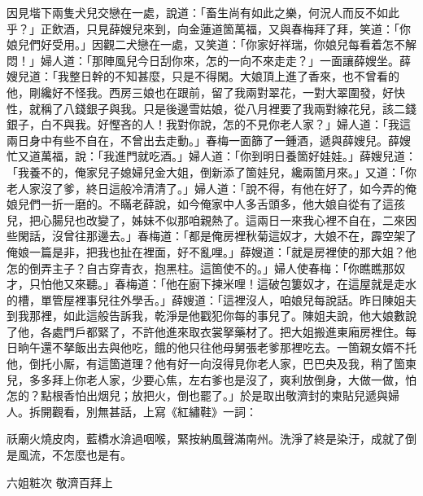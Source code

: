 因見堦下兩隻犬兒交戀在一處，說道：「畜生尚有如此之樂，何況人而反不如此乎？」正飲酒，只見薛嫂兒來到，向金蓮道箇萬福，又與春梅拜了拜，笑道：「你娘兒們好受用。」因觀二犬戀在一處，又笑道：「你家好祥瑞，你娘兒每看着怎不解悶！」婦人道：「那陣風兒今日刮你來，怎的一向不來走走？」一面讓薛嫂坐。薛嫂兒道：「我整日幹的不知甚麼，只是不得閑。大娘頂上進了香來，也不曾看的他，剛纔好不怪我。西房三娘也在跟前，留了我兩對翠花，一對大翠圍發，好快性，就稱了八錢銀子與我。只是後邊雪姑娘，從八月裡要了我兩對線花兒，該二錢銀子，白不與我。好慳吝的人！{}我對你說，怎的不見你老人家？」婦人道：「我這兩日身中有些不自在，不曾出去走動。」春梅一面篩了一鍾酒，遞與薛嫂兒。薛嫂忙又道萬福，說：「我進門就吃酒。」婦人道：「你到明日養箇好娃娃。」薛嫂兒道：「我養不的，俺家兒子媳婦兒金大姐，倒新添了箇娃兒，纔兩箇月來。」{}又道：「你老人家沒了爹，終日這般冷清清了。」婦人道：「說不得，有他在好了，如今弄的俺娘兒們一折一磨的。不瞞老薛說，如今俺家中人多舌頭多，他大娘自從有了這孩兒，把心腸兒也改變了，姊妹不似那咱親熱了。這兩日一來我心裡不自在，二來因些閑話，沒曾往那邊去。」春梅道：「都是俺房裡秋菊這奴才，大娘不在，霹空架了俺娘一篇是非，把我也扯在裡面，好不亂哩。」{}薛嫂道：「就是房裡使的那大姐？他怎的倒弄主子？自古穿青衣，抱黑柱。這箇使不的。」婦人使春梅：「你瞧瞧那奴才，只怕他又來聽。」{}春梅道：「他在廚下揀米哩！這破包簍奴才，在這屋就是走水的槽，單管屋裡事兒往外學舌。」薛嫂道：「這裡沒人，咱娘兒每說話。昨日陳姐夫到我那裡，如此這般告訴我，乾淨是他戳犯你每的事兒了。陳姐夫說，他大娘數說了他，各處門戶都緊了，不許他進來取衣裳拏藥材了。把大姐搬進東廂房裡住。每日晌午還不拏飯出去與他吃，餓的他只往他母舅張老爹那裡吃去。一箇親女婿不托他，倒托小厮，有這箇道理？他有好一向沒得見你老人家，巴巴央及我，稍了箇柬兒，多多拜上你老人家，少要心焦，左右爹也是沒了，爽利放倒身，大做一做，怕怎的？{}點根香怕出烟兒；放把火，倒也罷了。」於是取出敬濟封的柬貼兒遞與婦人。拆開觀看，別無甚話，上寫《紅繡鞋》一詞：

\begin{myquote}
祅廟火燒皮肉，藍橋水渰過咽喉，緊按納風聲滿南州。洗淨了終是染汙，成就了倒是風流，不怎麼也是有。{}

六姐粧次 敬濟百拜上
\end{myquote}


